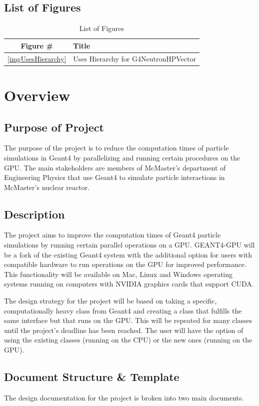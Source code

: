 \documentclass[12pt]{article}
\begin{document}
\subsection{List of Figures}

\begin{table}[h]
\centering
\caption{List of Figures}\label{Table_Figures}
\begin{tabular}{cl}
\toprule
\bf Figure \# & \bf Title\\\midrule
\ref{imgUsesHierarchy} & Uses Hierarchy for G4NeutronHPVector\\
\bottomrule
\end{tabular}
\end{table}

\section{Overview}
\subsection{Purpose of Project}
The purpose of the project is to reduce the computation times of particle simulations in Geant4 by parallelizing and running certain procedures on the GPU. The main stakeholders are members of McMaster's department of Engineering Physics that use Geant4 to simulate particle interactions in McMaster's nuclear reactor.

\subsection{Description}
The project aims to improve the computation times of Geant4 particle simulations by running certain parallel operations on a GPU. GEANT4-GPU will be a fork of the existing Geant4 system with the additional option for users with compatible hardware to run operations on the GPU for improved performance. This functionality will be available on Mac, Linux and Windows operating systems running on computers with NVIDIA graphics cards that support CUDA.

The design strategy for the project will be based on taking a specific, computationally heavy class from Geant4 and creating a class that fulfills the same interface but that runs on the GPU. This will be repeated for many classes until the project's deadline has been reached. The user will have the option of using the existing classes (running on the CPU) or the new ones (running on the GPU).

\subsection{Document Structure \& Template}
The design documentation for the project is broken into two main documents.
\end{document}
